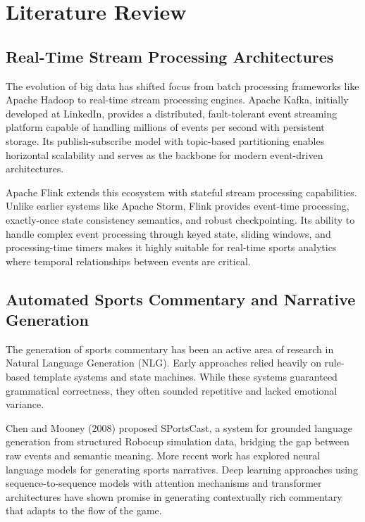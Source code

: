 \section{Literature Review}

\subsection{Real-Time Stream Processing Architectures}
The evolution of big data has shifted focus from batch processing frameworks like Apache Hadoop to real-time stream processing engines. Apache Kafka, initially developed at LinkedIn, provides a distributed, fault-tolerant event streaming platform capable of handling millions of events per second with persistent storage. Its publish-subscribe model with topic-based partitioning enables horizontal scalability and serves as the backbone for modern event-driven architectures.

Apache Flink extends this ecosystem with stateful stream processing capabilities. Unlike earlier systems like Apache Storm, Flink provides event-time processing, exactly-once state consistency semantics, and robust checkpointing. Its ability to handle complex event processing through keyed state, sliding windows, and processing-time timers makes it highly suitable for real-time sports analytics where temporal relationships between events are critical.

\subsection{Automated Sports Commentary and Narrative Generation}
The generation of sports commentary has been an active area of research in Natural Language Generation (NLG). Early approaches relied heavily on rule-based template systems and state machines. While these systems guaranteed grammatical correctness, they often sounded repetitive and lacked emotional variance.

Chen and Mooney (2008) proposed SPortsCast, a system for grounded language generation from structured Robocup simulation data, bridging the gap between raw events and semantic meaning. More recent work has explored neural language models for generating sports narratives. Deep learning approaches using sequence-to-sequence models with attention mechanisms and transformer architectures have shown promise in generating contextually rich commentary that adapts to the flow of the game.

